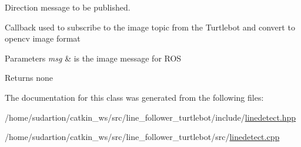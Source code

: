 Direction message to be published. 

Callback used to subscribe to the image topic from the Turtlebot and convert to opencv image format 
\begin{DoxyParams}{Parameters}
{\em msg} & is the image message for R\+OS \\
\hline
\end{DoxyParams}
\begin{DoxyReturn}{Returns}
none 
\end{DoxyReturn}


The documentation for this class was generated from the following files\+:\begin{DoxyCompactItemize}
\item 
/home/sudartion/catkin\+\_\+ws/src/line\+\_\+follower\+\_\+turtlebot/include/\hyperlink{linedetect_8hpp}{linedetect.\+hpp}\item 
/home/sudartion/catkin\+\_\+ws/src/line\+\_\+follower\+\_\+turtlebot/src/\hyperlink{linedetect_8cpp}{linedetect.\+cpp}\end{DoxyCompactItemize}
